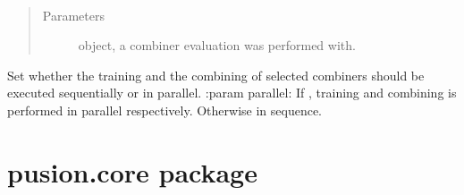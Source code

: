 \documentclass[letterpaper,10pt,english]{sphinxmanual}
\begin{document}
\begin{fulllineitems}
\begin{fulllineitems}
\begin{quote}
\begin{description}
\end{description}\end{quote}

\end{fulllineitems}


\begin{fulllineitems}
\label{\detokenize{pusion.control.decision_processor:pusion.control.decision_processor.DecisionProcessor.set_evaluation}}~\begin{quote}\begin{description}
\item[{Parameters}] \leavevmode
\sphinxAtStartPar
{} \textendash{}  object, a combiner evaluation was
performed with.

\end{description}\end{quote}

\end{fulllineitems}


\begin{fulllineitems}
\label{\detokenize{pusion.control.decision_processor:pusion.control.decision_processor.DecisionProcessor.set_parallel}}
\sphinxAtStartPar
Set whether the training and the combining of selected combiners should be executed sequentially or in parallel.
:param parallel: If , training and combining is performed in parallel respectively. Otherwise in sequence.

\end{fulllineitems}


\end{fulllineitems}



\section{pusion.core package}
\label{\detokenize{pusion.core:pusion-core-package}}\label{\detokenize{pusion.core::doc}}
\end{document}
